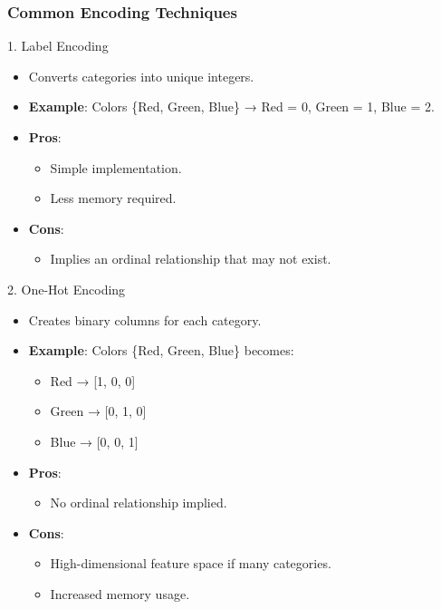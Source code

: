 \documentclass[aspectratio=169]{beamer}
\begin{document}
\begin{frame}[fragile]
    \frametitle{Common Encoding Techniques}
    \begin{block}{1. Label Encoding}
        \begin{itemize}
            \item Converts categories into unique integers.
            \item \textbf{Example}: Colors \{Red, Green, Blue\} → Red = 0, Green = 1, Blue = 2.
            \item \textbf{Pros}:
                \begin{itemize}
                    \item Simple implementation.
                    \item Less memory required.
                \end{itemize}
            \item \textbf{Cons}:
                \begin{itemize}
                    \item Implies an ordinal relationship that may not exist.
                \end{itemize}
        \end{itemize}
    \end{block}
    
    \begin{block}{2. One-Hot Encoding}
        \begin{itemize}
            \item Creates binary columns for each category.
            \item \textbf{Example}: Colors \{Red, Green, Blue\} becomes:
            \begin{itemize}
                \item Red → [1, 0, 0]
                \item Green → [0, 1, 0]
                \item Blue → [0, 0, 1]
            \end{itemize}
            \item \textbf{Pros}:
                \begin{itemize}
                    \item No ordinal relationship implied.
                \end{itemize}
            \item \textbf{Cons}:
                \begin{itemize}
                    \item High-dimensional feature space if many categories.
                    \item Increased memory usage.
                \end{itemize}
        \end{itemize}
    \end{block}
\end{frame}
\end{document}
